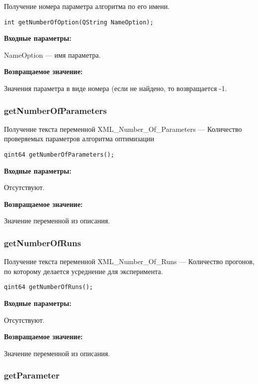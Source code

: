 \documentclass[a4paper,12pt]{article}
\begin{document}
Получение номера параметра алгоритма по его имени.


\begin{lstlisting}[label=code_syntax_getNumberOfOption,caption=Синтаксис]
int getNumberOfOption(QString NameOption);
\end{lstlisting}

\textbf{Входные параметры:}

NameOption --- имя параметра.

\textbf{Возвращаемое значение:}

Значения параметра в виде номера (если не найдено, то возвращается -1.


\subsubsection{getNumberOfParameters}\label{getNumberOfParameters}

Получение текста переменной  XML\_Number\_Of\_Parameters --- Количество проверяемых параметров алгоритма оптимизации


\begin{lstlisting}[label=code_syntax_getNumberOfParameters,caption=Синтаксис]
qint64 getNumberOfParameters();
\end{lstlisting}

\textbf{Входные параметры:}

Отсутствуют.

\textbf{Возвращаемое значение:}

Значение переменной из описания.


\subsubsection{getNumberOfRuns}\label{getNumberOfRuns}

Получение текста переменной  XML\_Number\_Of\_Runs --- Количество прогонов, по которому делается усреднение для эксперимента.


\begin{lstlisting}[label=code_syntax_getNumberOfRuns,caption=Синтаксис]
qint64 getNumberOfRuns();
\end{lstlisting}

\textbf{Входные параметры:}

Отсутствуют.

\textbf{Возвращаемое значение:}

Значение переменной из описания.


\subsubsection{getParameter}\label{getParameter}
\end{document}
